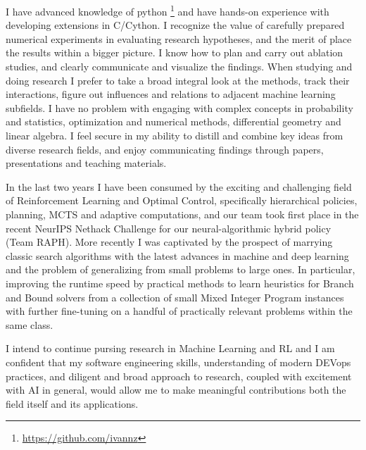 \documentclass[14pt]{letter}
\begin{document}
I have advanced knowledge of python%
\footnote{
    \url{https://github.com/ivannz}
}
and have hands-on experience with developing extensions in C/Cython.
%
I recognize the value of carefully prepared numerical experiments in evaluating research
hypotheses, and the merit of place the results within a bigger picture. I know how to
plan and carry out ablation studies, and clearly communicate and visualize the findings.
%
When studying and doing research I prefer to take a broad integral look at the methods,
track their interactions, figure out influences and relations to adjacent machine learning
subfields.
%
I have no problem with engaging with complex concepts in probability and statistics,
optimization and numerical methods, differential geometry and linear algebra.
%
I feel secure in my ability to distill and combine key ideas from diverse research fields,
and enjoy communicating findings through papers, presentations and teaching materials.
\par\medskip

In the last two years I have been consumed by the exciting and challenging field of Reinforcement
Learning and Optimal Control, specifically hierarchical policies, planning, MCTS and adaptive
computations, and our team took first place in the recent NeurIPS Nethack Challenge for
our neural-algorithmic hybrid policy (Team RAPH). More recently I was captivated by the
prospect of marrying classic search algorithms with the latest advances in machine and deep
learning and the problem of generalizing from small problems to large ones. In particular,
improving the runtime speed by practical methods to learn heuristics for Branch and Bound
solvers from a collection of small Mixed Integer Program instances with further fine-tuning
on a handful of practically relevant problems within the same class.

I intend to continue pursing research in Machine Learning and RL and I am confident that my
software engineering skills, understanding of modern DEVops practices, and diligent and broad
approach to research, coupled with excitement with AI in general, would allow me to make
meaningful contributions both the field itself and its applications.
\par\medskip

\end{document}
